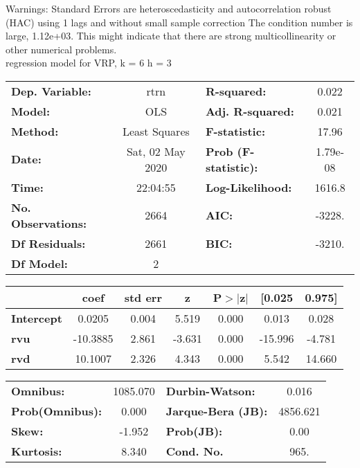 Warnings: \newline
 [1] Standard Errors are heteroscedasticity and autocorrelation robust (HAC) using 1 lags and without small sample correction \newline
 [2] The condition number is large, 1.12e+03. This might indicate that there are \newline
 strong multicollinearity or other numerical problems.\\ 

regression model for VRP, k = 6 h = 3\begin{center}
\begin{tabular}{lclc}
\toprule
\textbf{Dep. Variable:}    &       rtrn       & \textbf{  R-squared:         } &     0.022   \\
\textbf{Model:}            &       OLS        & \textbf{  Adj. R-squared:    } &     0.021   \\
\textbf{Method:}           &  Least Squares   & \textbf{  F-statistic:       } &     17.96   \\
\textbf{Date:}             & Sat, 02 May 2020 & \textbf{  Prob (F-statistic):} &  1.79e-08   \\
\textbf{Time:}             &     22:04:55     & \textbf{  Log-Likelihood:    } &    1616.8   \\
\textbf{No. Observations:} &        2664      & \textbf{  AIC:               } &    -3228.   \\
\textbf{Df Residuals:}     &        2661      & \textbf{  BIC:               } &    -3210.   \\
\textbf{Df Model:}         &           2      & \textbf{                     } &             \\
\bottomrule
\end{tabular}
\begin{tabular}{lcccccc}
                   & \textbf{coef} & \textbf{std err} & \textbf{z} & \textbf{P$> |$z$|$} & \textbf{[0.025} & \textbf{0.975]}  \\
\midrule
\textbf{Intercept} &       0.0205  &        0.004     &     5.519  &         0.000        &        0.013    &        0.028     \\
\textbf{rvu}       &     -10.3885  &        2.861     &    -3.631  &         0.000        &      -15.996    &       -4.781     \\
\textbf{rvd}       &      10.1007  &        2.326     &     4.343  &         0.000        &        5.542    &       14.660     \\
\bottomrule
\end{tabular}
\begin{tabular}{lclc}
\textbf{Omnibus:}       & 1085.070 & \textbf{  Durbin-Watson:     } &    0.016  \\
\textbf{Prob(Omnibus):} &   0.000  & \textbf{  Jarque-Bera (JB):  } & 4856.621  \\
\textbf{Skew:}          &  -1.952  & \textbf{  Prob(JB):          } &     0.00  \\
\textbf{Kurtosis:}      &   8.340  & \textbf{  Cond. No.          } &     965.  \\
\bottomrule
\end{tabular}
\end{center}

